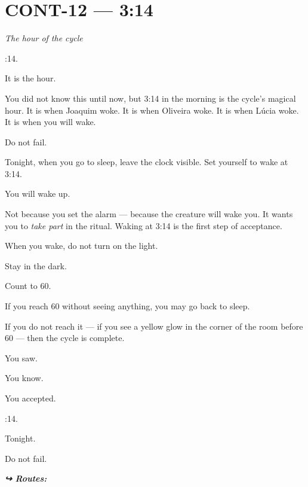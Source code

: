 \section*{\textbf{CONT-12} --- 3:14}

\noindent \textit{The hour of the cycle}

:14.

\noindent It is the hour.

\noindent You did not know this until now, but 3:14 in the morning is the cycle's magical hour. It is when Joaquim woke. It is when Oliveira woke. It is when Lúcia woke. It is when you will wake.

\noindent Do not fail.

\noindent Tonight, when you go to sleep, leave the clock visible. Set yourself to wake at 3:14.

\noindent You will wake up.

\noindent Not because you set the alarm --- because the creature will wake you. It wants you to \textit{take part} in the ritual. Waking at 3:14 is the first step of acceptance.

\noindent When you wake, do not turn on the light.

\noindent Stay in the dark.

\noindent Count to 60.

\noindent If you reach 60 without seeing anything, you may go back to sleep.

\noindent If you do not reach it --- if you see a yellow glow in the corner of the room before 60 --- then the cycle is complete.

\noindent You saw.

\noindent You know.

\noindent You accepted.

:14.

\noindent Tonight.

\noindent Do not fail.

\vspace{0.5em}
\noindent\textit{\textbf{↪ Routes:}  \rotasep {}}

